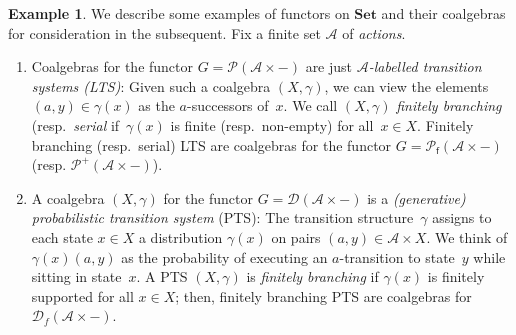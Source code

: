 \documentclass[sigconf,
			final%
			nonacm
                        ]{acmart}
\newcommand{\takeout}[1]{\empty}
\numberwithin{equation}{section}
\numberwithin{equation}{section}
\theoremstyle{plain}
\theoremstyle{definition}
\newtheorem{expl}[thm]{Example}
\newcommand{\Set}{\mathbf{Set}}
\newcommand{\N}{\mathds{N}}            %
\newcommand{\A}{\mathcal{A}}            %
\newcommand{\pow}{\mathscr P}              %
\newcommand{\powf}{\pow_{\mathsf f}}
\newcommand{\CalN}{\mathcal{N}}           %
\newcommand{\CalD}{\mathcal{D}}            %
\begin{document}
\begin{expl}\label{E:coalg}
  We describe some examples of functors on $\Set$ and their coalgebras
  for consideration in the subsequent. Fix a finite set $\A$ of
  \emph{actions}.
\begin{enumerate}
\item\label{E:coalg:1} Coalgebras for the functor $G=\pow(\A\times -)$
  are just %
  \emph{$\A$-labelled transition systems (LTS)}: Given such a
  coalgebra $(X, \gamma)$, we can view the elements
  $(a, y)\in\gamma(x)$ as the $a$-successors of~$x$. We call
  $(X, \gamma)$ \emph{finitely branching} (resp.~\emph{serial}
  if~$\gamma(x)$ is finite (resp.~non-empty) for all~$x\in X$.
 Finitely branching (resp.~serial) LTS are coalgebras for
 the functor $G=\powf(\A\times -)$ (resp. $\pow^+(\A\times -)$).


\takeout{
\item A coalgebra for the neighborhood functor $\CalN$ is a
  \emph{neighborhood frame}~\cite{HKP09}: a map
  $\nu\colon X\to \CalN X$ assigning each state $x\in X$ to its
  set of \emph{neighbourhoods} $\nu(x)\in\CalN X$.%
  \smnote{I wouldn't write $\pow(\pow X)$; this gives the wrong
    impression that $\N$ is the double covariant powerset functor.}
  A morphism
  of neighborhood frames (also: \emph{bounded morphism}) from
  $(X, \nu)$ to $(X', \nu')$ is a map $f\colon X\to X'$ such that for
  all $x\in X$: $f^{-1}[V]\in\nu(x)$ iff $V\in\nu'(f(x))$ for all
  $V\in\pow X'$.
}%

\item A coalgebra $(X,\gamma)$ for the functor $G=\CalD(\A\times -)$
  is a \emph{(generative) probabilistic transition system} (PTS): The
  transition structure~$\gamma$ assigns to each state $x\in X$ a
  distribution $\gamma(x)$ on pairs $(a,y)\in\A\times X$. We think of
  $\gamma(x)(a, y)$ as the probability of executing an $a$-transition
  to state~$y$ while sitting in state~$x$.
%
  A PTS $(X, \gamma)$ is \emph{finitely branching} if $\gamma(x)$ is
  finitely supported for all $x\in X$; then, finitely branching PTS
  are coalgebras for $\CalD_f(\A\times -)$.
\end{enumerate}
\end{expl}
\end{document}
